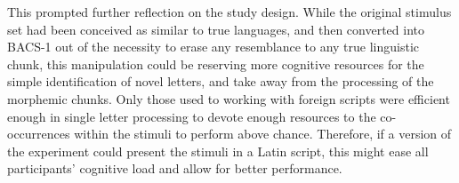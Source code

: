 This prompted further reflection on the study design. While the original stimulus set had been conceived as similar to true languages, and then converted into BACS-1 out of the necessity to erase any resemblance to any true linguistic chunk, this manipulation could be reserving more cognitive resources for the simple identification of novel letters, and take away from the processing of the morphemic chunks. Only those used to working with foreign scripts were efficient enough in single letter processing to devote enough resources to the co-occurrences within the stimuli to perform above chance. Therefore, if a version of the experiment could present the stimuli in a Latin script, this might ease all participants' cognitive load and allow for better performance. 